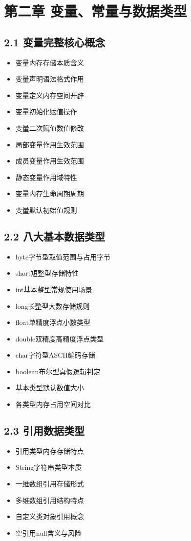 \section{第二章 变量、常量与数据类型}
\subsection{2.1 变量完整核心概念}
\begin{itemize}
\item 变量内存存储本质含义
\item 变量声明语法格式作用
\item 变量定义内存空间开辟
\item 变量初始化赋值操作
\item 变量二次赋值数值修改
\item 局部变量作用生效范围
\item 成员变量作用生效范围
\item 静态变量作用域特性
\item 变量内存生命周期周期
\item 变量默认初始值规则
\end{itemize}

\subsection{2.2 八大基本数据类型}
\begin{itemize}
\item byte字节型取值范围与占用字节
\item short短整型存储特性
\item int基本整型常规使用场景
\item long长整型大数存储规则
\item float单精度浮点小数类型
\item double双精度高精度浮点类型
\item char字符型ASCII编码存储
\item boolean布尔型真假逻辑判定
\item 基本类型默认数值大小
\item 各类型内存占用空间对比
\end{itemize}

\subsection{2.3 引用数据类型}
\begin{itemize}
\item 引用类型内存存储特点
\item String字符串类型本质
\item 一维数组引用存储形式
\item 多维数组引用结构特点
\item 自定义类对象引用概念
\item 空引用null含义与风险
\end{itemize}

